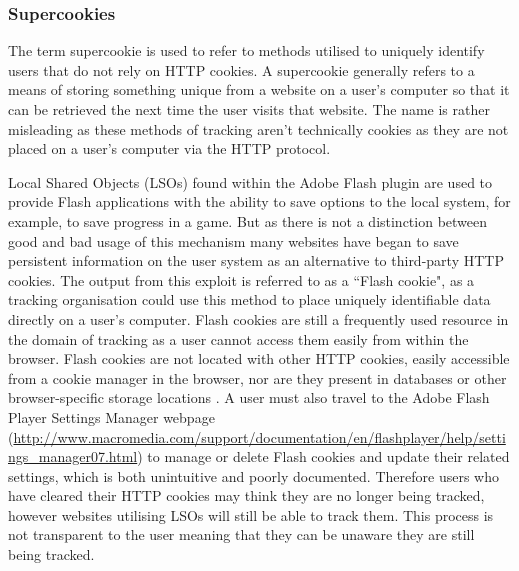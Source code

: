 \documentclass[12pt]{article}
\begin{document}
\subsubsection{Supercookies} \label{Supercookies}
The term supercookie is used to refer to methods utilised to uniquely identify users that do not rely on HTTP cookies. A supercookie generally refers to a means of storing something unique from a website on a user's computer so that it can be retrieved the next time the user visits that website. The name is rather misleading as these methods of tracking aren't technically cookies as they are not placed on a user's computer via the HTTP protocol. \newline 

Local Shared Objects (LSOs) found within the Adobe Flash plugin are used to provide Flash applications with the ability to save options to the local system, for example, to save progress in a game. But as there is not a distinction between good and bad usage of this mechanism many websites have began to save persistent information on the user system as an alternative to third-party HTTP cookies. The output from this exploit is referred to as a ``Flash cookie", as a tracking organisation could use this method to place uniquely identifiable data directly on a user's computer. Flash cookies are still a frequently used resource in the domain of tracking as a user cannot access them easily from within the browser. Flash cookies are not located with other HTTP cookies, easily accessible from a cookie manager in the browser, nor are they present in databases or other browser-specific storage locations \parencite{flashCookies}. A user must also travel to the Adobe Flash Player Settings Manager webpage (\url{http://www.macromedia.com/support/documentation/en/flashplayer/help/settings_manager07.html}) to manage or delete Flash cookies and update their related settings, which is both unintuitive and poorly documented. Therefore users who have cleared their HTTP cookies may think they are no longer being tracked, however websites utilising LSOs will still be able to track them. This process is not transparent to the user meaning that they can be unaware they are still being tracked.\\ 
\end{document}
